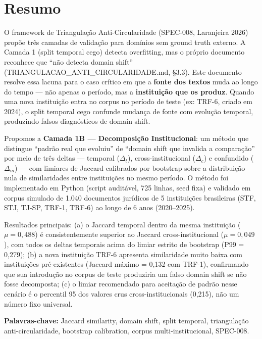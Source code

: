 \documentclass[12pt,a4paper]{article}
\theoremstyle{remark}
\begin{document}
\section*{Resumo}

O framework de Triangulação Anti-Circularidade (SPEC-008, Laranjeira 2026) propõe três camadas de validação para domínios sem ground truth externo. A Camada 1 (split temporal cego) detecta overfitting, mas o próprio documento reconhece que ``não detecta domain shift'' (TRIANGULACAO\_ANTI\_CIRCULARIDADE.md, §3.3). Este documento resolve essa lacuna para o caso crítico em que a \textbf{fonte dos textos} muda ao longo do tempo — não apenas o período, mas a \textbf{instituição que os produz}. Quando uma nova instituição entra no corpus no período de teste (ex: TRF-6, criado em 2024), o split temporal cego confunde mudança de fonte com evolução temporal, produzindo falsos diagnósticos de domain shift.

Propomos a \textbf{Camada 1B — Decomposição Institucional}: um método que distingue ``padrão real que evoluiu'' de ``domain shift que invalida a comparação'' por meio de três deltas — temporal ($\Delta_t$), cross-institucional ($\Delta_c$) e confundido ($\Delta_m$) — com limiares de Jaccard calibrados por bootstrap sobre a distribuição nula de similaridades entre instituições no mesmo período. O método foi implementado em Python (script auditável, 725 linhas, seed fixa) e validado em corpus simulado de 1.040 documentos jurídicos de 5 instituições brasileiras (STF, STJ, TJ-SP, TRF-1, TRF-6) ao longo de 6 anos (2020--2025). 

Resultados principais: (a) o Jaccard temporal dentro da mesma instituição ($\mu = 0,488$) é consistentemente superior ao Jaccard cross-institucional ($\mu = 0,049$), com todos os deltas temporais acima do limiar estrito de bootstrap (P99 = 0,279); (b) a nova instituição TRF-6 apresenta similaridade muito baixa com instituições pré-existentes (Jaccard máximo = 0,132 com TRF-1), confirmando que sua introdução no corpus de teste produziria um falso domain shift se não fosse decomposta; (c) o limiar recomendado para aceitação de padrão nesse cenário é o percentil 95 dos valores crus cross-institucionais (0,215), não um número fixo universal.

\textbf{Palavras-chave:} Jaccard similarity, domain shift, split temporal, triangulação anti-circularidade, bootstrap calibration, corpus multi-institucional, SPEC-008.
\end{document}
